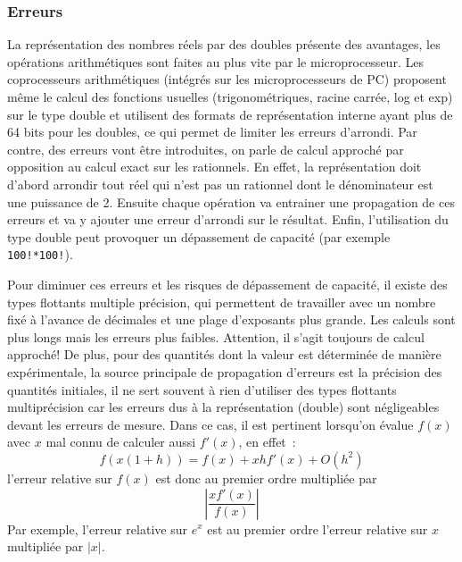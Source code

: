 \documentclass[a4paper,11pt]{article}
\begin{document}
\subsubsection{Erreurs} 
La repr\'esentation des nombres r\'eels par des doubles pr\'esente
des avantages, les op\'erations arithm\'etiques
sont faites au plus vite par le microprocesseur.
Les coprocesseurs arithmétiques (intégrés sur les microprocesseurs
de PC) proposent m\^eme
le calcul des fonctions usuelles (trigonométriques, racine carrée, log et exp)
sur le type double et utilisent des formats de représentation interne
ayant plus de 64 bits pour les doubles, ce qui permet de limiter
les erreurs d'arrondi. 
Par contre, des erreurs vont \^etre introduites,
on parle de calcul approch\'e par opposition au calcul exact sur les
rationnels. En effet, la repr\'esentation doit d'abord arrondir 
tout r\'eel qui n'est pas un rationnel dont le d\'enominateur
est une puissance de 2. Ensuite chaque op\'eration va entrainer
une propagation de ces erreurs et va y ajouter une erreur d'arrondi 
sur le r\'esultat.
Enfin, l'utilisation du type double peut provoquer un d\'epassement
de capacit\'e (par exemple \verb|100!*100!|).

Pour diminuer ces erreurs et les risques de d\'epassement de
capacit\'e, il existe des types flottants multiple pr\'ecision,
qui permettent de travailler avec un nombre fix\'e \`a l'avance
de d\'ecimales et une plage d'exposants plus grande. Les calculs sont plus longs mais les erreurs
plus faibles. Attention, il s'agit toujours de calcul approch\'e!
De plus, pour des quantit\'es dont la valeur est d\'etermin\'ee
de mani\`ere exp\'erimentale, la source principale de propagation
d'erreurs est la pr\'ecision des quantit\'es initiales, il ne sert
souvent \`a rien d'utiliser des types flottants multipr\'ecision car les
erreurs dus à la représentation (double) sont négligeables devant
les erreurs de mesure. Dans ce cas, il est pertinent lorsqu'on
\'evalue $f(x)$ avec $x$ mal connu de calculer aussi $f'(x)$, en effet~:
$$ f(x(1+h))= f(x)+xh f'(x) + O(h^2)$$
l'erreur relative sur $f(x)$ est donc au premier ordre multipli\'ee par
$$ |\frac{xf'(x)}{f(x)}|$$
Par exemple, l'erreur relative sur $e^x$ est au premier ordre l'erreur relative sur $x$
multipli\'ee par $|x|$.
\end{document}
